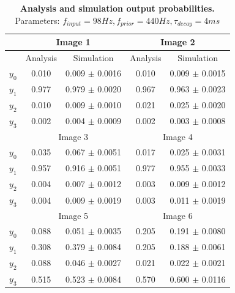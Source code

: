 \begin{table}[]
\label{tab:1D_98_440_4}
\small
\tabcolsep=0.11cm
\begin{tabular}{|c|cc|cc|}
\hline
                       & \multicolumn{2}{c|}{Image 1}                       & \multicolumn{2}{c|}{Image 2}                       \\ \hline
                       & \multicolumn{1}{c|}{Analysis} & Simulation         & \multicolumn{1}{c|}{Analysis} & Simulation         \\ \hline
$y_0$                  & \multicolumn{1}{c|}{0.010}    & 0.009 $\pm$ 0.0016 & \multicolumn{1}{c|}{0.010}    & 0.009 $\pm$ 0.0015 \\ \hline
$y_1$                  & \multicolumn{1}{c|}{0.977}    & 0.979 $\pm$ 0.0020 & \multicolumn{1}{c|}{0.967}    & 0.963 $\pm$ 0.0023 \\ \hline
$y_2$                  & \multicolumn{1}{c|}{0.010}    & 0.009 $\pm$ 0.0010 & \multicolumn{1}{c|}{0.021}    & 0.025 $\pm$ 0.0020 \\ \hline
$y_3$                  & \multicolumn{1}{c|}{0.002}    & 0.004 $\pm$ 0.0009 & \multicolumn{1}{c|}{0.002}    & 0.003 $\pm$ 0.0008 \\ \hline
                       & \multicolumn{2}{c|}{Image 3}                       & \multicolumn{2}{c|}{Image 4}                       \\ \hline
$y_0$                  & \multicolumn{1}{c|}{0.035}    & 0.067 $\pm$ 0.0051 & \multicolumn{1}{c|}{0.017}    & 0.025 $\pm$ 0.0031 \\ \hline
$y_1$                  & \multicolumn{1}{c|}{0.957}    & 0.916 $\pm$ 0.0051 & \multicolumn{1}{c|}{0.977}    & 0.955 $\pm$ 0.0033 \\ \hline
$y_2$                  & \multicolumn{1}{c|}{0.004}    & 0.007 $\pm$ 0.0012 & \multicolumn{1}{c|}{0.003}    & 0.009 $\pm$ 0.0012 \\ \hline
$y_3$                  & \multicolumn{1}{c|}{0.004}    & 0.009 $\pm$ 0.0019 & \multicolumn{1}{c|}{0.003}    & 0.011 $\pm$ 0.0019 \\ \hline
						& \multicolumn{2}{c|}{Image 5}                       & \multicolumn{2}{c|}{Image 6}                       \\ \hline
$y_0$                  & \multicolumn{1}{c|}{0.088}    & 0.051 $\pm$ 0.0035 & \multicolumn{1}{c|}{0.205}    & 0.191 $\pm$ 0.0080 \\ \hline
$y_1$                  & \multicolumn{1}{c|}{0.308}    & 0.379 $\pm$ 0.0084 & \multicolumn{1}{c|}{0.205}    & 0.188 $\pm$ 0.0061 \\ \hline
$y_2$                  & \multicolumn{1}{c|}{0.088}    & 0.046 $\pm$ 0.0027 & \multicolumn{1}{c|}{0.021}    & 0.022 $\pm$ 0.0021 \\ \hline
$y_3$                  & \multicolumn{1}{c|}{0.515}    & 0.523 $\pm$ 0.0084 & \multicolumn{1}{c|}{0.570}    & 0.600 $\pm$ 0.0116 \\ \hline
\end{tabular}
\caption{\textbf{Analysis and simulation output probabilities. } Parameters: $f_{input} = 98 Hz, f_{prior} = 440 Hz, \tau_{decay} = 4 ms$}
\end{table}

